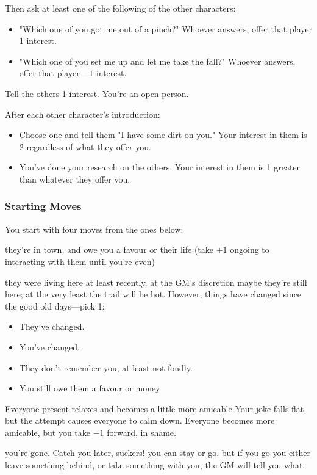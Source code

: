 Then ask at least one of the following of the other characters:
\begin{itemize}
\item "Which one of you got me out of a pinch?" Whoever answers, offer that player 1-interest.
\item "Which one of you set me up and let me take the fall?" Whoever answers, offer that player $-1$-interest.
\end{itemize}
Tell the others 1-interest. You're an open person.

After each other character's introduction:
\begin{itemize}
\item Choose one and tell them "I have some dirt on you." Your interest in them is 2 regardless of what they offer you.
\item You've done your research on the others. Your interest in them is 1 greater than whatever they offer you.
\end{itemize}

\subsubsection{Starting Moves}
You start with four moves from the ones below:

{they're in town, and owe you a favour or their life (take $+1$ ongoing to interacting with them until you're even)}
{they were living here at least recently, at the GM's discretion maybe they're still here; at the very least the trail will be hot. However, things have changed since the good old days---pick 1:
\begin{itemize}
\item They've changed.
\item You've changed.
\item They don't remember you, at least not fondly.
\item You still owe them a favour or money
\end{itemize}}

{Everyone present relaxes and becomes a little more amicable}
{Your joke falls flat, but the attempt causes everyone to calm down. Everyone becomes more amicable, but you take $-1$ forward, in shame.}

{you're gone. Catch you later, suckers!}
{you can stay or go, but if you go you either leave something behind, or take something with you, the GM will tell you what.}


